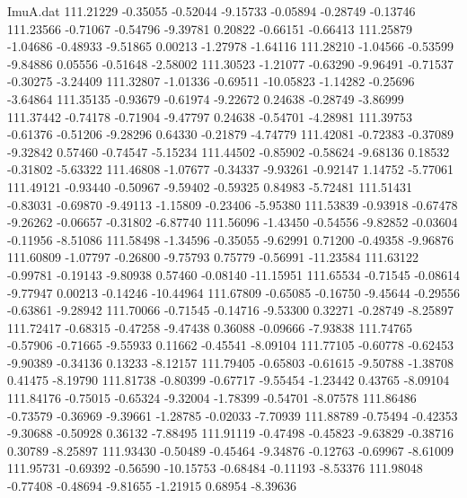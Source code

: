 \begin{filecontents}{ImuA.dat}
 111.21229   -0.35055   -0.52044   -9.15733   -0.05894   -0.28749   -0.13746
 111.23566   -0.71067   -0.54796   -9.39781    0.20822   -0.66151   -0.66413
 111.25879   -1.04686   -0.48933   -9.51865    0.00213   -1.27978   -1.64116
 111.28210   -1.04566   -0.53599   -9.84886    0.05556   -0.51648   -2.58002
 111.30523   -1.21077   -0.63290   -9.96491   -0.71537   -0.30275   -3.24409
 111.32807   -1.01336   -0.69511  -10.05823   -1.14282   -0.25696   -3.64864
 111.35135   -0.93679   -0.61974   -9.22672    0.24638   -0.28749   -3.86999
 111.37442   -0.74178   -0.71904   -9.47797    0.24638   -0.54701   -4.28981
 111.39753   -0.61376   -0.51206   -9.28296    0.64330   -0.21879   -4.74779
 111.42081   -0.72383   -0.37089   -9.32842    0.57460   -0.74547   -5.15234
 111.44502   -0.85902   -0.58624   -9.68136    0.18532   -0.31802   -5.63322
 111.46808   -1.07677   -0.34337   -9.93261   -0.92147    1.14752   -5.77061
 111.49121   -0.93440   -0.50967   -9.59402   -0.59325    0.84983   -5.72481
 111.51431   -0.83031   -0.69870   -9.49113   -1.15809   -0.23406   -5.95380
 111.53839   -0.93918   -0.67478   -9.26262   -0.06657   -0.31802   -6.87740
 111.56096   -1.43450   -0.54556   -9.82852   -0.03604   -0.11956   -8.51086
 111.58498   -1.34596   -0.35055   -9.62991    0.71200   -0.49358   -9.96876
 111.60809   -1.07797   -0.26800   -9.75793    0.75779   -0.56991  -11.23584
 111.63122   -0.99781   -0.19143   -9.80938    0.57460   -0.08140  -11.15951
 111.65534   -0.71545   -0.08614   -9.77947    0.00213   -0.14246  -10.44964
 111.67809   -0.65085   -0.16750   -9.45644   -0.29556   -0.63861   -9.28942
 111.70066   -0.71545   -0.14716   -9.53300    0.32271   -0.28749   -8.25897
 111.72417   -0.68315   -0.47258   -9.47438    0.36088   -0.09666   -7.93838
 111.74765   -0.57906   -0.71665   -9.55933    0.11662   -0.45541   -8.09104
 111.77105   -0.60778   -0.62453   -9.90389   -0.34136    0.13233   -8.12157
 111.79405   -0.65803   -0.61615   -9.50788   -1.38708    0.41475   -8.19790
 111.81738   -0.80399   -0.67717   -9.55454   -1.23442    0.43765   -8.09104
 111.84176   -0.75015   -0.65324   -9.32004   -1.78399   -0.54701   -8.07578
 111.86486   -0.73579   -0.36969   -9.39661   -1.28785   -0.02033   -7.70939
 111.88789   -0.75494   -0.42353   -9.30688   -0.50928    0.36132   -7.88495
 111.91119   -0.47498   -0.45823   -9.63829   -0.38716    0.30789   -8.25897
 111.93430   -0.50489   -0.45464   -9.34876   -0.12763   -0.69967   -8.61009
 111.95731   -0.69392   -0.56590  -10.15753   -0.68484   -0.11193   -8.53376
 111.98048   -0.77408   -0.48694   -9.81655   -1.21915    0.68954   -8.39636

\end{filecontents}
